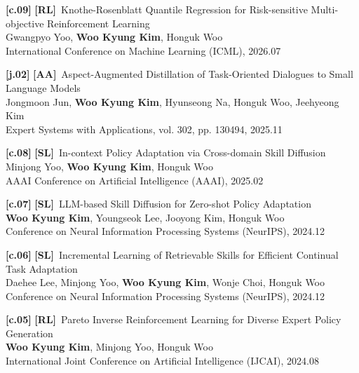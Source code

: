 \documentclass[letterpaper,11pt]{article}
\newcommand{\RL}{\textbf{\textcolor{RLgreen}{[RL]}}}
\newcommand{\SL}{\textbf{\textcolor{SLpurple}{[SL]}}}
\newcommand{\Aa}{\textbf{\textcolor{AAred}{[AA]}}}
\begin{document}
\begin{itemize}[leftmargin=0.15in, label={}]
{{    \textbf{[c.09]} \RL \ {\href{}{}Knothe-Rosenblatt Quantile Regression for Risk-sensitive Multi-objective Reinforcement Learning} \\
    {Gwangpyo Yoo, \textbf{Woo Kyung Kim}, Honguk Woo} \\
    {International Conference on Machine Learning (ICML), 2026.07} \\
    \vspace{1.5mm}

    \textbf{[j.02]} \Aa \ {\href{}{}Aspect-Augmented Distillation of Task-Oriented Dialogues to Small Language Models} \\
    {Jongmoon Jun, \textbf{Woo Kyung Kim}, Hyunseong Na, Honguk Woo, Jeehyeong Kim} \\
    {Expert Systems with Applications, vol. 302, pp. 130494, 2025.11} \\
    \vspace{1.5mm}

    \textbf{[c.08]} \SL \ {\href{}{}In-context Policy Adaptation via Cross-domain Skill Diffusion} \\
    {Minjong Yoo, \textbf{Woo Kyung Kim}, Honguk Woo} \\
    {AAAI Conference on Artificial Intelligence (AAAI), 2025.02} \\
    \vspace{1.5mm}

    \textbf{[c.07]} \SL \ {LLM-based Skill Diffusion for Zero-shot Policy Adaptation} \\
    {\textbf{Woo Kyung Kim}, Youngseok Lee, Jooyong Kim, Honguk Woo} \\
    {Conference on Neural Information Processing Systems (NeurIPS), 2024.12} \\
    \vspace{1.5mm}

    \textbf{[c.06]} \SL \ {Incremental Learning of Retrievable Skills for Efficient Continual Task Adaptation} \\
    {Daehee Lee, Minjong Yoo, \textbf{Woo Kyung Kim}, Wonje Choi, Honguk Woo} \\
    {Conference on Neural Information Processing Systems (NeurIPS), 2024.12} \\
    \vspace{1.5mm}

    \textbf{[c.05]} \RL \ {Pareto Inverse Reinforcement Learning for Diverse Expert Policy Generation} \\
    {\textbf{Woo Kyung Kim}, Minjong Yoo, Honguk Woo} \\
    {International Joint Conference on Artificial Intelligence (IJCAI), 2024.08} \\
    \vspace{1.5mm}

}}
\end{itemize}
\end{document}
